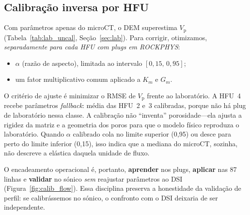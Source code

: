 \documentclass[11pt,a4paper]{article}
\numberwithin{equation}{section}
\newcommand{\Vp}{\ensuremath{V_{\mathrm{p}}}}
\begin{document}
\subsection{Calibração inversa por HFU}

Com parâmetros apenas do microCT, o DEM superestima \Vp{}
(Tabela~\ref{tab:lab_uncal}, Seção~\ref{sec:lab}).
Para corrigir, otimizamos, \emph{separadamente para cada HFU com plugs em
ROCKPHYS}:

\begin{itemize}
  \item $\alpha$ (razão de aspecto), limitada ao intervalo $[0{,}15,\,0{,}95]$;
  \item um fator multiplicativo comum aplicado a $K_m$ e $G_m$.
\end{itemize}

O critério de ajuste é minimizar o RMSE de \Vp{} frente ao laboratório.
A HFU~4 recebe parâmetros \emph{fallback}: média das HFU~2 e~3 calibradas,
porque não há plug de laboratório nessa classe.
A calibração não ``inventa'' porosidade---ela ajusta a rigidez da
matriz e a geometria dos poros para que o modelo físico reproduza o
laboratório.
Quando $\alpha$ calibrado cola no limite superior (0,95) ou desce para perto
do limite inferior (0,15), isso indica que a mediana do microCT, sozinha, não
descreve a elástica daquela unidade de fluxo.

O encadeamento operacional é, portanto, \textbf{aprender} nos plugs,
\textbf{aplicar} nas 87 linhas e \textbf{validar} no sónico \emph{sem}
reajustar parâmetros ao DSI (Figura~\ref{fig:calib_flow}).
Essa disciplina preserva a honestidade da validação de perfil: se
calibrássemos no sónico, o confronto com o DSI deixaria de ser
independente.
\end{document}
